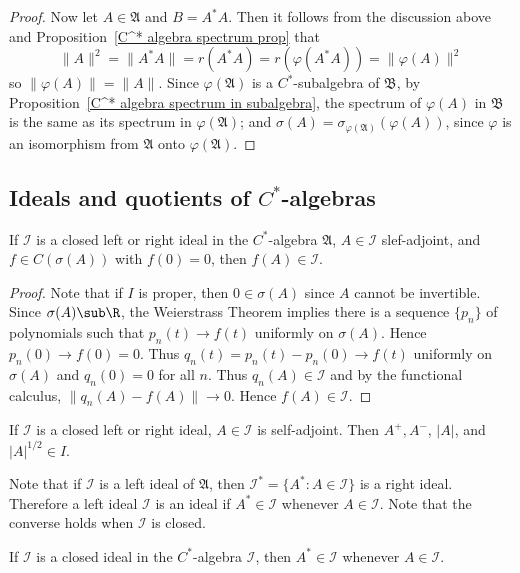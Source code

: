 \begin{proof}
Now let $A\in\mathfrak{A}$ and $B=A^*A$. Then it follows from the discussion above and Proposition~\ref{C^* algebra spectrum prop} that
\[\|A\|^2=\|A^*A\|=r(A^*A)=r(\varphi(A^*A))=\|\varphi(A)\|^2\]
so $\|\varphi(A)\|=\|A\|$. Since $\varphi(\mathfrak{A})$ is a $C^*$-subalgebra of $\mathfrak{B}$, by Proposition~\ref{C^* algebra spectrum in subalgebra}, the spectrum of $\varphi(A)$ in $\mathfrak{B}$ is the same as its spectrum in $\varphi(\mathfrak{A})$; and $\sigma(A)=\sigma_{\varphi(\mathfrak{A})}(\varphi(A))$, since $\varphi$ is an isomorphism from $\mathfrak{A}$ onto $\varphi(\mathfrak{A})$.
\end{proof}
\subsection{Ideals and quotients of $C^*$-algebras}
\begin{proposition}\label{C^* algebra closed ideal under function calculus}
If $\mathscr{I}$ is a closed left or right ideal in the $C^*$-algebra $\mathfrak{A}$, $A\in\mathscr{I}$ slef-adjoint, and $f\in C(\sigma(A))$ with $f(0)=0$, then $f(A)\in\mathscr{I}$.
\end{proposition}
\begin{proof}
Note that if $I$ is proper, then $0\in\sigma(A)$ since $A$ cannot be invertible. Since $\sigma(A)\sub\R$, the Weierstrass Theorem implies there is a sequence $\{p_n\}$ of polynomials such that $p_n(t)\to f(t)$ uniformly on $\sigma(A)$. Hence $p_n(0)\to f(0)=0$. Thus $q_n(t)=p_n(t)-p_n(0)\to f(t)$ uniformly on $\sigma(A)$ and $q_n(0)=0$ for all $n$. Thus $q_n(A)\in\mathscr{I}$ and by the functional calculus, $\|q_n(A)-f(A)\|\to 0$. Hence $f(A)\in\mathscr{I}$.
\end{proof}
\begin{corollary}
If $\mathscr{I}$ is a closed left or right ideal, $A\in\mathscr{I}$ is self-adjoint. Then $A^+,A^-$, $|A|$, and $|A|^{1/2}\in I$.
\end{corollary}
Note that if $\mathscr{I}$ is a left ideal of $\mathfrak{A}$, then $\mathscr{I}^*=\{A^*:A\in\mathscr{I}\}$ is a right ideal. Therefore a left ideal $\mathscr{I}$ is an ideal if $A^*\in\mathscr{I}$ whenever $A\in\mathscr{I}$. Note that the converse holds when $\mathscr{I}$ is closed.
\begin{theorem}\label{C^* algebra closed ideal under adjoint}
If $\mathscr{I}$ is a closed ideal in the $C^*$-algebra $\mathscr{I}$, then $A^*\in\mathscr{I}$ whenever $A\in\mathscr{I}$.
\end{theorem}
